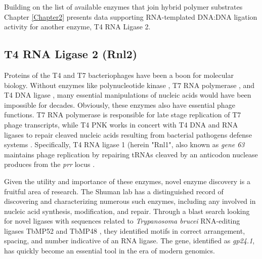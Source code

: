 Building on the list of available enzymes that join hybrid polymer substrates Chapter \ref{Chapter2} presents data supporting RNA-templated DNA:DNA ligation activity for another enzyme, T4 RNA Ligase 2.

\subsection{T4 RNA Ligase 2 (Rnl2)}

Proteins of the T4 and T7 bacteriophages have been a boon for molecular biology. Without enzymes like polynucleotide kinase \citep{Richardson1965a}, T7 RNA polymerase \citep{Summers1970b}, and T4 DNA ligase \citep{Weiss1967a}, many essential manipulations of nucleic acids would have been impossible for decades. Obviously, these enzymes also have essential phage functions. T7 RNA polymerase is responsible for late stage replication of T7 phage transcripts, while T4 PNK works in concert with T4 DNA and RNA ligases to repair cleaved	nucleic acids resulting from bacterial pathogens defense systems \citep{Wang2002b}. Specifically, T4 RNA ligase 1 (herein "Rnl1", also known as \textit{gene 63} maintains phage replication by repairing tRNAs cleaved by an anticodon nuclease produces from the \textit{prr} locus \citep{Amitsur1987d}.

Given the utility and importance of these enzymes, novel enzyme discovery is a fruitful area of research. The Shuman lab has a distinguished record of discovering and characterizing numerous such enzymes, including any involved in nucleic acid synthesis, modification, and repair. Through a blast search looking for novel ligases with sequences related to \textit{Trypanosoma brucei} RNA-editing ligases TbMP52 and TbMP48 \citep{Ho2002b}, they identified motifs in correct arrangement, spacing, and number indicative of an RNA ligase. The gene, identified as \textit{gp24.1}, has quickly become an essential tool in the era of modern genomics.

